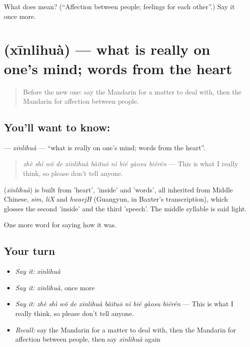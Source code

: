 \begin{tcolorbox}[breakable,colback=teal!4,colframe=teal!35!black,title={Before you move on}]
What does  mean? (\textquotedblleft{}Affection between people; feelings for each other\textquotedblright{}.) Say it once more.
\end{tcolorbox}
\section[\texorpdfstring{\zh{心里话} (xīnlihuà)}{心里话 (xīnlihuà)}]{ (xīnlihuà) — what is really on one's mind; words from the heart}

\label{lesson:ZH-C459-xinlihua}



\begin{quote}
Before the new one: say the Mandarin for a matter to deal with, then the Mandarin for affection between people.
\end{quote}

\subsection*{You'll want to know: }
\textbf{} — \emph{xīnlihuà} — \textquotedblleft{}what is really on one's mind; words from the heart\textquotedblright{}.

\begin{quote}
\emph{zhè shì wǒ de xīnlihuà bàituō nǐ bié gàosu biérén} — This is what I really think, so please don't tell anyone.
\end{quote}

\begin{cousinweb}
\textbf{} (\emph{xīnlihuà}) is built from  'heart',  'inside' and  'words', all inherited from Middle Chinese, \emph{sim}, \emph{liX} and \emph{hwaejH} (Guangyun, in Baxter's transcription), which glosses the second 'inside' and the third 'speech'. The middle syllable is said light.
\end{cousinweb}

\begin{grammarlens}[title={What you've built}]
One more word for saying how it was.
\end{grammarlens}

\subsection*{Your turn}
\begin{itemize}
\raggedright
  \item \emph{Say it:} \emph{xīnlihuà}
  \item \emph{Say it:} \emph{xīnlihuà}, once more
  \item \emph{Say it:} \emph{zhè shì wǒ de xīnlihuà bàituō nǐ bié gàosu biérén} — This is what I really think, so please don't tell anyone.
  \item \emph{Recall:} say the Mandarin for a matter to deal with, then the Mandarin for affection between people, then say \emph{xīnlihuà} again
\end{itemize}

